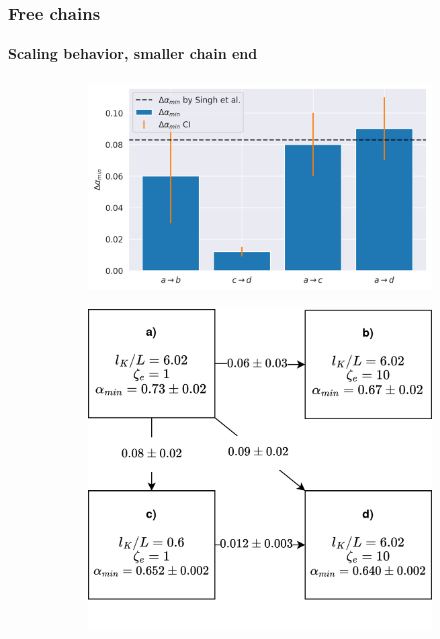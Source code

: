 \documentclass[handout]{beamer}
\begin{document}
\begin{frame}
    \frametitle{Free chains}
    \framesubtitle{Scaling behavior, smaller chain end}
    \begin{figure}
        \centering
        \begin{subfigure}{0.58\textwidth}
            \centering
            \includegraphics[width=\textwidth]{17+18+19+20-exp-delta_alpha_min_fm.png}
        \end{subfigure}
        \begin{subfigure}{0.4\textwidth}
            \centering
            \includegraphics[width=\textwidth]{cases_diag.png}
        \end{subfigure}
    \end{figure}
\end{frame}
\end{document}
